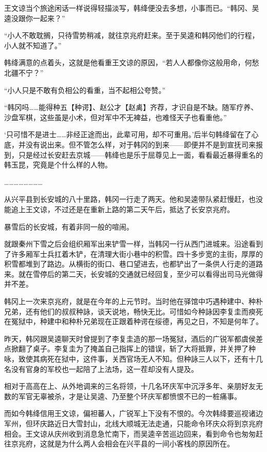 王文谅当个旅途闲话一样说得轻描淡写，韩绛便没去多想，小事而已。“韩冈、吴逵没跟你一起来？”

“小人不敢耽搁，只待雪势稍减，就往京兆府赶来。至于吴逵和韩冈他们的行程，小人就不知道了。”

韩绛满意的点着头，这就是他看重王文谅的原因，“若人人都像你这般用命，何愁北疆不宁？”

“小人只是不敢有负相公的看重，当不起相公夸赞。”

“韩冈吗……能得种五【种谔】、赵公才【赵禼】齐荐，才识自是不缺。随军疗养、沙盘军棋，这些虽是小术，但对军中不无裨益，也难怪天子也看重他。”

‘只可惜不是进士……非经正途而出，此辈可用，却不可重用。’后半句韩绛留在了心底，并没有说出来。但不管怎么样，对于韩冈的到来——即便并不是到宣抚司来报到，只是经过长安赶去京城——韩绛也是乐于屈尊见上一面，看看最近暴得重名的韩玉昆，究竟是个什么样的人物。

……………………

从兴平县到长安城的八十里路，韩冈一行走了两天。他和吴逵带队紧赶慢赶，也没能追上王文谅，不过还是在重新上路的第二天午后，抵达了长安京兆府。

暴雪后的长安城，有着非同一般的喧闹。

就跟秦州下雪之后会组织厢军出来铲雪一样，当韩冈一行从西门进城来。沿途看到了许多厢军士兵扛着木铲，在清理大街小巷中的积雪。四十多步宽的主街，厚厚的积雪都堆到了路边。从横街的街口、巷口望进去，也都铲出了一条供人行走的道路来。就在雪停后的第二天，长安城的交通就已经回复，至少可以看得出司马光做得并不差。

韩冈上一次来京兆府，就是在今年的上元节时。当时他在驿馆中巧遇种建中、种朴兄弟，还有他们的叔叔种詠，谈天说地，畅快无比。可惜如今种詠因李复圭而瘐死在冤狱中，种建中和种朴兄弟现在正跟着种谔在绥德，再见之日，不知是何年了。

昨天，韩冈跟吴逵聊天时曾提到了李复圭造的那一场冤狱，酒后的广锐军都虞侯差点掀翻了桌子。李复圭为了掩盖自己指挥上的错误，斩了大将抵罪，并关押了种咏，致使其病死在狱中，这件事，关西官场无人不知。但种詠三人以下，还有十几名没有官身的军校也一起陪了上法场，这一茬却没有人提及。

相对于高高在上、从外地调来的三名将领，十几名环庆军中沉浮多年、亲朋好友无数的军官无辜被杀，才是让吴逵、乃至整个环庆军都愤恨不已的一桩痛事。

而如今韩绛信用王文谅，偏袒蕃人，广锐军上下没有不恨的。今次韩绛要巡视诸边军州，但环庆路近日大雪封山，北线大顺城无法走通，只能命令环庆众将到京兆府相会。王文谅从庆州收到消息急忙南下，而吴逵辛苦巡边回来，看到命令也匆匆赶往京兆府，这就是为什么两人会相会在兴平县的一间小客栈的原因所在。

